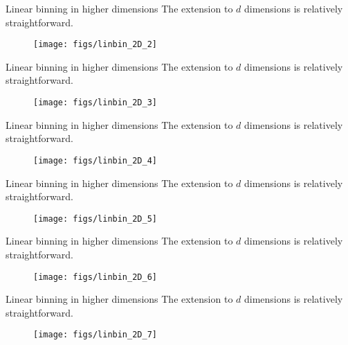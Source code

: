 \documentclass[11pt, aspectratio=149]{beamer}
\theoremstyle{plain}
\begin{document}
\begin{frame}[fragile, t]{Linear binning in higher dimensions}
	The extension to $d$ dimensions is relatively straightforward.
	\vfill
	\begin{figure}
		\centering
		\texttt{[image: figs/linbin\_2D\_2]}
	\end{figure}
\end{frame}

\begin{frame}[fragile, t]{Linear binning in higher dimensions}
	The extension to $d$ dimensions is relatively straightforward.
	\vfill
	\begin{figure}
		\centering
		\texttt{[image: figs/linbin\_2D\_3]}
	\end{figure}
\end{frame}

\begin{frame}[fragile, t]{Linear binning in higher dimensions}
	The extension to $d$ dimensions is relatively straightforward.
	\vfill
	\begin{figure}
		\centering
		\texttt{[image: figs/linbin\_2D\_4]}
	\end{figure}
\end{frame}

\begin{frame}[fragile, t]{Linear binning in higher dimensions}
	The extension to $d$ dimensions is relatively straightforward.
	\vfill
	\begin{figure}
		\centering
		\texttt{[image: figs/linbin\_2D\_5]}
	\end{figure}
\end{frame}

\begin{frame}[fragile, t]{Linear binning in higher dimensions}
	The extension to $d$ dimensions is relatively straightforward.
	\vfill
	\begin{figure}
		\centering
		\texttt{[image: figs/linbin\_2D\_6]}
	\end{figure}
\end{frame}

\begin{frame}[fragile, t]{Linear binning in higher dimensions}
	The extension to $d$ dimensions is relatively straightforward.
	\vfill
	\begin{figure}
		\centering
		\texttt{[image: figs/linbin\_2D\_7]}
	\end{figure}
\end{frame}
\end{document}
